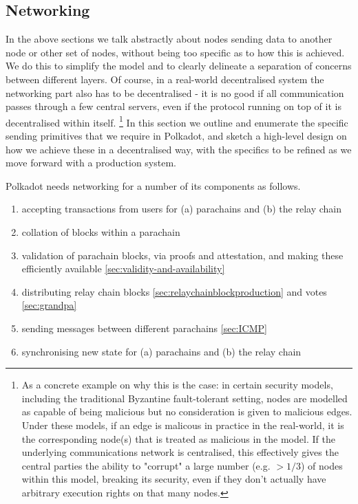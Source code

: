 \subsection{Networking}\label{sec:networking}

In the above sections we talk abstractly about nodes sending data to another
node or other set of nodes, without being too specific as to how this is
achieved. We do this to simplify the model and to clearly delineate a
separation of concerns between different layers. Of course, in a real-world
decentralised system the networking part also has to be decentralised - it is
no good if all communication passes through a few central servers, even if the
protocol running on top of it is decentralised within itself. \footnote{As a
concrete example on why this is the case: in certain security models, including
the traditional Byzantine fault-tolerant setting, nodes are modelled as capable
of being malicious but no consideration is given to malicious edges. Under
these models, if an edge is malicous in practice in the real-world, it is the
corresponding node(s) that is treated as malicious in the model. If the
underlying communications network is centralised, this effectively gives the
central parties the ability to "corrupt" a large number (e.g. $> 1/3$) of nodes
within this model, breaking its security, even if they don't actually have
arbitrary execution rights on that many nodes.} In this section we outline and
enumerate the specific sending primitives that we require in Polkadot, and
sketch a high-level design on how we achieve these in a decentralised way, with
the specifics to be refined as we move forward with a production system.

Polkadot needs networking for a number of its components as follows.
\begin{enumerate}
\item accepting transactions from users for (a) parachains and (b) the relay chain
\item collation of blocks within a parachain
\item validation of parachain blocks, via proofs and attestation, and making these efficiently available \ref{sec:validity-and-availability}
\item distributing relay chain blocks \ref{sec:relaychainblockproduction} and votes \ref{sec:grandpa}
\item sending messages between different parachains \ref{sec:ICMP}
\item synchronising new state for (a) parachains and (b) the relay chain
\end{enumerate}

